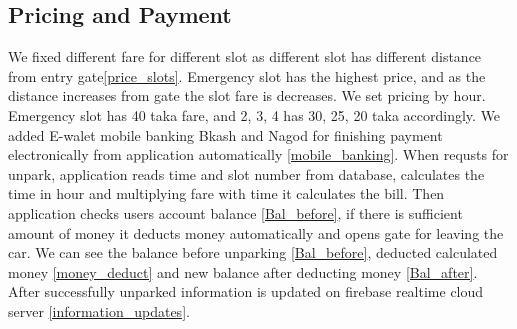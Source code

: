 \subsection{Pricing and Payment}
We fixed different fare for different slot as different slot has different distance from entry gate\ref{price_slots}. Emergency slot has the highest price, and as the distance increases from gate the slot fare is decreases. We set pricing by hour. Emergency slot has 40 taka fare, and 2, 3, 4 has 30, 25, 20 taka accordingly. We added E-walet mobile banking Bkash and Nagod for finishing payment electronically from application automatically \ref{mobile_banking}. When requsts for unpark, application reads time and slot number from database, calculates the time in hour and multiplying fare with time it calculates the bill. Then application checks users account balance \ref{Bal_before}, if there is sufficient amount of money it deducts money automatically and opens gate for leaving the car. We can see the balance before unparking \ref{Bal_before}, deducted calculated money \ref{money_deduct} and new balance after deducting money \ref{Bal_after}. After successfully unparked information is updated on firebase realtime cloud server \ref{information_updates}.

